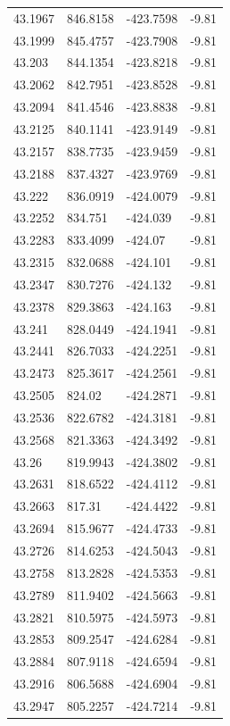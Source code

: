 \begin{table}[H]
\begin{tabular}{llll}
43.1967 & 846.8158 & -423.7598 & -9.81 \\
43.1999 & 845.4757 & -423.7908 & -9.81 \\
43.203 & 844.1354 & -423.8218 & -9.81 \\
43.2062 & 842.7951 & -423.8528 & -9.81 \\
43.2094 & 841.4546 & -423.8838 & -9.81 \\
43.2125 & 840.1141 & -423.9149 & -9.81 \\
43.2157 & 838.7735 & -423.9459 & -9.81 \\
43.2188 & 837.4327 & -423.9769 & -9.81 \\
43.222 & 836.0919 & -424.0079 & -9.81 \\
43.2252 & 834.751 & -424.039 & -9.81 \\
43.2283 & 833.4099 & -424.07 & -9.81 \\
43.2315 & 832.0688 & -424.101 & -9.81 \\
43.2347 & 830.7276 & -424.132 & -9.81 \\
43.2378 & 829.3863 & -424.163 & -9.81 \\
43.241 & 828.0449 & -424.1941 & -9.81 \\
43.2441 & 826.7033 & -424.2251 & -9.81 \\
43.2473 & 825.3617 & -424.2561 & -9.81 \\
43.2505 & 824.02 & -424.2871 & -9.81 \\
43.2536 & 822.6782 & -424.3181 & -9.81 \\
43.2568 & 821.3363 & -424.3492 & -9.81 \\
43.26 & 819.9943 & -424.3802 & -9.81 \\
43.2631 & 818.6522 & -424.4112 & -9.81 \\
43.2663 & 817.31 & -424.4422 & -9.81 \\
43.2694 & 815.9677 & -424.4733 & -9.81 \\
43.2726 & 814.6253 & -424.5043 & -9.81 \\
43.2758 & 813.2828 & -424.5353 & -9.81 \\
43.2789 & 811.9402 & -424.5663 & -9.81 \\
43.2821 & 810.5975 & -424.5973 & -9.81 \\
43.2853 & 809.2547 & -424.6284 & -9.81 \\
43.2884 & 807.9118 & -424.6594 & -9.81 \\
43.2916 & 806.5688 & -424.6904 & -9.81 \\
43.2947 & 805.2257 & -424.7214 & -9.81 \\

\end{tabular}
\end{table}
